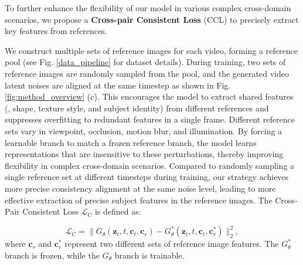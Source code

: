 To further enhance the flexibility of our model in various complex cross-domain scenarios, we propose a \textbf{Cross-pair Consistent Loss} (CCL) to precisely extract key features from references.

We construct multiple sets of reference images for each video, forming a reference pool (see Fig. \ref{data_pipeline} for dataset details). During training, two sets of reference images are randomly sampled from the pool, and the generated video latent noises are aligned at the same timestep as shown in Fig. \ref{fig:method_overview} (c). This encourages the model to extract shared features (\eg, shape, texture style, and subject identity) from different references and suppresses overfitting to redundant features in a single frame. Different reference sets vary in viewpoint, occlusion, motion blur, and illumination. By forcing a learnable branch to match a frozen reference branch, the model learns representations that are insensitive to these perturbations, thereby improving flexibility in complex cross-domain scenarios. Compared to randomly sampling a single reference set at different timesteps during training, our strategy achieves more precise consistency alignment at the same noise level, leading to more effective extraction of precise subject features in the reference images. The Cross-Pair Consistent Loss $\mathcal{L}_{\mathrm{C}}$ is defined as:

\begin{equation}
\mathcal{L}_{\mathrm{C}}=\|{G}_\theta(\boldsymbol{z}_t,t,\boldsymbol{c}_t,\boldsymbol{c}_r)-{G}^*_\theta(\boldsymbol{z}_t,t,\boldsymbol{c}_t,\boldsymbol{c}^*_r)\|_2^2,
\label{eq:loss_2}
\end{equation}
where $\boldsymbol{c}_r$ and $\boldsymbol{c}^*_r$ represent two different sets of reference image features. The ${G}^*_\theta$ branch is frozen, while the ${G}_\theta$ branch is trainable.




